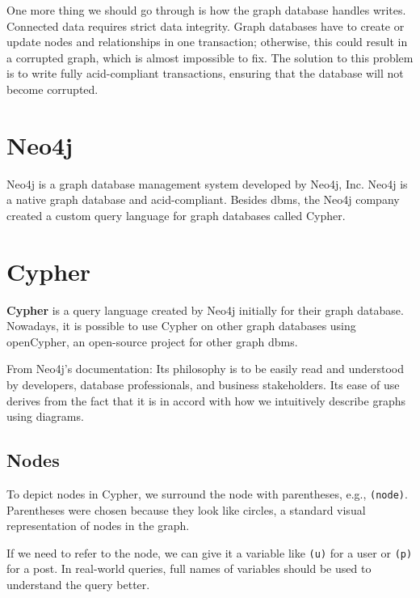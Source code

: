 One more thing we should go through is how the graph database handles writes. Connected data requires strict data integrity.
Graph databases have to create or update nodes and relationships in one transaction; otherwise, this could result in a corrupted graph, which is almost impossible to fix.
The solution to this problem is to write fully \acrshort{acid}-compliant transactions, ensuring that the database will not become corrupted.
\cite{chao_graph_2018}

\section{Neo4j}

Neo4j is a graph database management system developed by Neo4j, Inc. \cite{neo4j_company_nodate}
Neo4j is a native graph database and \acrshort{acid}-compliant.
Besides \acrshort{dbms}, the Neo4j company created a custom query language for graph databases called Cypher. \cite{neo4j_neo4j_nodate}

\section{Cypher}

\textbf{Cypher} is a query language created by Neo4j initially for their graph database.
Nowadays, it is possible to use Cypher on other graph databases using openCypher, an open-source project for other graph \acrshort{dbms}. \cite{noauthor_resources_nodate}

From Neo4j's documentation: Its philosophy is to be easily read and understood by developers, database professionals, and business stakeholders.
Its ease of use derives from the fact that it is in accord with how we intuitively describe graphs using diagrams. \cite{robinson_graph_2015}

\subsection{Nodes}

To depict nodes in Cypher, we surround the node with parentheses, e.g., \texttt{(node)}.
Parentheses were chosen because they look like circles, a standard visual representation of nodes in the graph. \cite{noauthor_getting_nodate}

If we need to refer to the node, we can give it a variable like \texttt{(u)} for a user or \texttt{(p)} for a post.
In real-world queries, full names of variables should be used to understand the query better.

